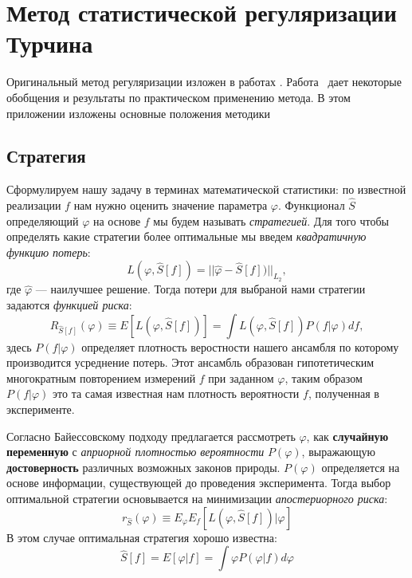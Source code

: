 \chapter{Метод статистической регуляризации Турчина}\label{app:A}

Оригинальный метод регуляризации изложен в работах \cite{turchin, turovceva}. Работа~\cite{statreg} дает некоторые обобщения и результаты по практическом применению метода.  В этом приложении изложены основные положения методики
\section{Стратегия}
Сформулируем нашу задачу в терминах математической статистики: по известной реализации $f$ нам нужно оценить значение параметра $\varphi$. Функционал $\hat{S}$ определяющий $\varphi$ на основе $f$ мы будем называть \textit{стратегией}. Для того чтобы определять какие стратегии более оптимальные мы введем \textit{квадратичную функцию потерь}:
\begin{equation}
L(\varphi,\hat{S}[f]) = ||\hat{\varphi}-\hat{S}[f])||_{L_2},
\end{equation}
где $\hat{\varphi}$ --- наилучшее решение. Тогда потери для выбраной нами стратегии задаются \textit{функцией риска}:
\begin{equation}
R_{\hat{S}[f]}(\varphi) \equiv E[L(\varphi,\hat{S}[f])] = \int L(\varphi,\hat{S}[f])P(f|\varphi)df,  
\end{equation}
здесь $P(f|\varphi)$ определяет плотность веростности нашего ансамбля по которому производится усреднение потерь. Этот ансамбль образован гипотетическим многократным повторением  измерений $f$ при заданном $\varphi$, таким образом $P(f|\varphi)$ это та самая известная нам плотность вероятности $f$, полученная в эксперименте.

Согласно Байессовскому подходу предлагается рассмотреть $\varphi$, как \textbf{случайную переменную} с \textit{априорной плотностью вероятности} $P(\varphi)$, выражающую \textbf{достоверность} различных возможных законов природы. $P(\varphi)$ определяется на основе информации, существующей до проведения эксперимента. Тогда выбор оптимальной стратегии основывается на минимизации \textit{апостериорного риска}:
\begin{equation}
r_{\hat{S}}(\varphi) \equiv E_{\varphi}E_{f}[L(\varphi,\hat{S}[f])|\varphi]
\end{equation}
В этом случае оптимальная стратегия хорошо известна:
\begin{equation}
\hat{S}[f] = E[\varphi|f] = \int \varphi P(\varphi|f)d\varphi
\label{eq:opt}
\end{equation}

